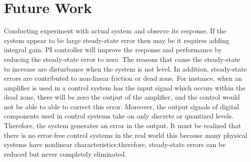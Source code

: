 \section{Future Work}

Conducting experiment with actual system and observe its response. 
If the system appear to be large steady-state error then may be it requires adding integral gain. 
PI controller will improve the response and performance by reducing the steady-state error to zero. 
The reasons that cause the steady-state to increase are disturbance when the system is not level. 
In addition, steady-state errors are contributed to non-linear friction or dead zone. 
For instance, when an amplifier is used in a control system has the input signal which occurs within the dead zone, there will be zero the output of the amplifier, and the control would not be able to able to correct this error. 
Moreover, the output signals of digital components used in control systems take on only discrete or quantized levels. 
Therefore, the system generates an error in the output. 
It must be realized that there is no error-free control systems in the real world this because many physical systems have nonlinear characteristics;therefore, steady-state errors can be reduced but never completely eliminated.